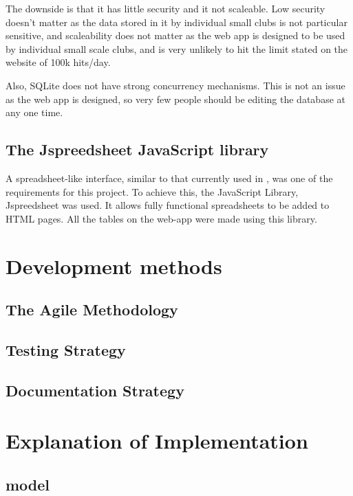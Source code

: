 \documentclass{l4proj}
\begin{document}
The downside is that it has little security and it not scaleable. Low security doesn't matter as the data stored in it by individual small clubs is not particular sensitive, and scaleability does not matter as the web app is designed to be used by individual small scale clubs, and is very unlikely to hit the limit stated on the website of 100k hits/day.

Also, SQLite does not have strong concurrency mechanisms. This is not an issue as the web app is designed, so very few people should be editing the database at any one time.

\subsection{The Jspreedsheet JavaScript library}

A spreadsheet-like interface, similar to that currently used in \citet{sailwave}, was one of the requirements for this project. To achieve this, the JavaScript Library, Jspreedsheet \citeyear{Jspreadsheet} was used. It allows fully functional spreadsheets to be added to HTML pages. All the tables on the web-app were made using this library.    

\section{Development methods}

\subsection{The Agile Methodology}

\subsection{Testing Strategy}

\subsection{Documentation Strategy}


\section{Explanation of Implementation}
\subsection{model}
\end{document}
